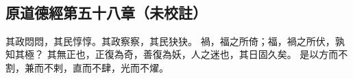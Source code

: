 ﻿%
%

\chapter{~}

\section{原道德經第五十八章（未校註）}

\begin{withgezhu}

\zhsong


其政悶悶，其民惇惇。其政察察，\textcolor{tongjia-color}{其民㹟㹟}。
禍，福之所倚；福，禍之所伏，孰知其極？
其無正也，正復為奇，善復為妖，人之迷也，其日固久矣。
是以方而不割，兼而不剌，直而不肆，光而不燿。

\end{withgezhu}
